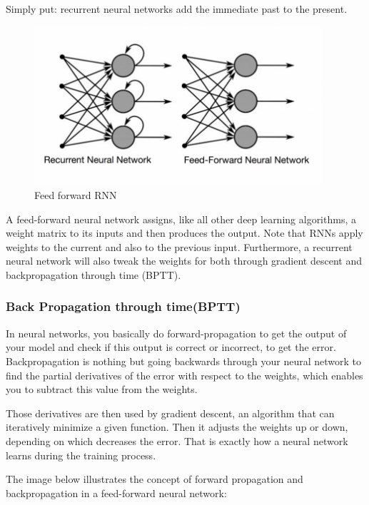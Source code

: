 \documentclass[12pt]{report}
\begin{document}
Simply put: recurrent neural networks add the immediate past to the present.

\begin{figure}[H]%
  \begin {center}
  \includegraphics[width=0.95\textwidth]{images/Rnn.png}
  \caption{Feed forward RNN}
  \label{fig:ecg}
  \end {center}
\end{figure}


A feed-forward neural network assigns, like all other deep learning algorithms, a weight matrix to its inputs and then produces the output. Note that RNNs apply weights to the current and also to the previous input. Furthermore, a recurrent neural network will also tweak the weights for both through gradient descent and backpropagation through time (BPTT). 

\subsubsection{Back Propagation through time(BPTT)}

In neural networks, you basically do forward-propagation to get the output of your model and check if this output is correct or incorrect, to get the error. Backpropagation is nothing but going backwards through your neural network to find the partial derivatives of the error with respect to the weights, which enables you to subtract this value from the weights.

Those derivatives are then used by gradient descent, an algorithm that can iteratively minimize a given function. Then it adjusts the weights up or down, depending on which decreases the error. That is exactly how a neural network learns during the training process.

The image below illustrates the concept of forward propagation and backpropagation in a feed-forward neural network:
\end{document}
